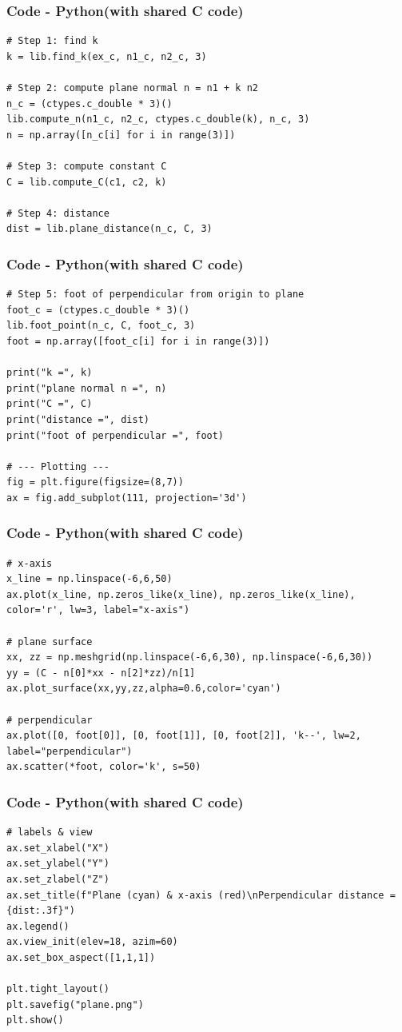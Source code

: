 \documentclass{beamer}
\theoremstyle{remark}
\numberwithin{equation}{section}
\begin{document}
\begin{frame}[fragile]
\frametitle{Code - Python(with shared C code)}
\begin{lstlisting}
# Step 1: find k
k = lib.find_k(ex_c, n1_c, n2_c, 3)

# Step 2: compute plane normal n = n1 + k n2
n_c = (ctypes.c_double * 3)()
lib.compute_n(n1_c, n2_c, ctypes.c_double(k), n_c, 3)
n = np.array([n_c[i] for i in range(3)])

# Step 3: compute constant C
C = lib.compute_C(c1, c2, k)

# Step 4: distance
dist = lib.plane_distance(n_c, C, 3)
\end{lstlisting}
\end{frame}

\begin{frame}[fragile]
\frametitle{Code - Python(with shared C code)}
\begin{lstlisting}
# Step 5: foot of perpendicular from origin to plane
foot_c = (ctypes.c_double * 3)()
lib.foot_point(n_c, C, foot_c, 3)
foot = np.array([foot_c[i] for i in range(3)])

print("k =", k)
print("plane normal n =", n)
print("C =", C)
print("distance =", dist)
print("foot of perpendicular =", foot)

# --- Plotting ---
fig = plt.figure(figsize=(8,7))
ax = fig.add_subplot(111, projection='3d')

\end{lstlisting}
\end{frame}

\begin{frame}[fragile]
\frametitle{Code - Python(with shared C code)}
\begin{lstlisting}
# x-axis
x_line = np.linspace(-6,6,50)
ax.plot(x_line, np.zeros_like(x_line), np.zeros_like(x_line), color='r', lw=3, label="x-axis")

# plane surface
xx, zz = np.meshgrid(np.linspace(-6,6,30), np.linspace(-6,6,30))
yy = (C - n[0]*xx - n[2]*zz)/n[1]
ax.plot_surface(xx,yy,zz,alpha=0.6,color='cyan')

# perpendicular
ax.plot([0, foot[0]], [0, foot[1]], [0, foot[2]], 'k--', lw=2, label="perpendicular")
ax.scatter(*foot, color='k', s=50)

\end{lstlisting}
\end{frame}

\begin{frame}[fragile]
\frametitle{Code - Python(with shared C code)}
\begin{lstlisting}
# labels & view
ax.set_xlabel("X")
ax.set_ylabel("Y")
ax.set_zlabel("Z")
ax.set_title(f"Plane (cyan) & x-axis (red)\nPerpendicular distance = {dist:.3f}")
ax.legend()
ax.view_init(elev=18, azim=60)
ax.set_box_aspect([1,1,1])

plt.tight_layout()
plt.savefig("plane.png")
plt.show()


\end{lstlisting}
\end{frame}
\end{document}
